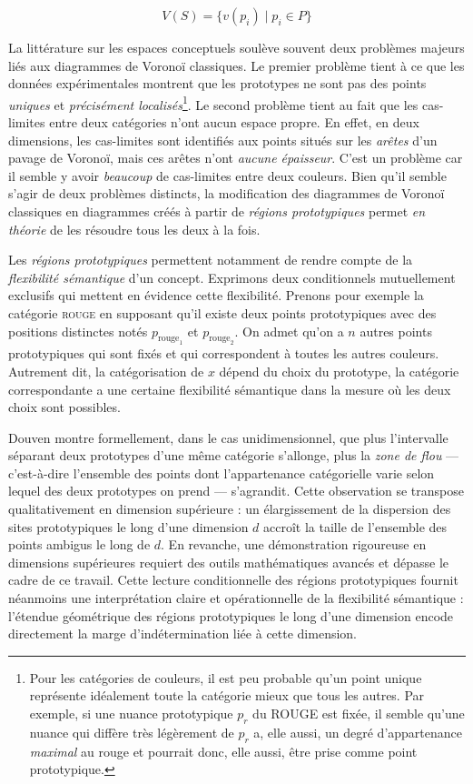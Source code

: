 \documentclass{article}
\begin{document}
\[
V(S) = \{v(p_i) \mid p_i \in P\}
\]

La littérature sur les espaces conceptuels soulève souvent deux problèmes majeurs liés aux diagrammes de Voronoï classiques. Le premier problème tient à ce que les données expérimentales montrent que les prototypes ne sont pas des points \textit{ uniques} et \textit{précisément localisés}\footnote{Pour les catégories de couleurs, il est peu probable qu’un point unique représente idéalement toute la catégorie mieux que tous les autres. Par exemple, si une nuance prototypique $p_r$ du ROUGE est fixée, il semble qu'une nuance qui diffère très légèrement de $p_r$ a, elle aussi, un degré d'appartenance \textit{maximal} au rouge et pourrait donc, elle aussi, être prise comme point prototypique.}. Le second problème tient au fait que les cas-limites entre deux catégories n'ont aucun espace propre. En effet, en deux dimensions, les cas-limites sont identifiés aux points situés sur les \textit{arêtes} d'un pavage de Voronoï, mais ces arêtes n'ont \textit{aucune épaisseur}. C'est un problème car il semble y avoir \textit{beaucoup} de cas-limites entre deux couleurs. Bien qu'il semble s'agir de deux problèmes distincts, la modification des diagrammes de Voronoï classiques en diagrammes créés à partir de \textit{régions prototypiques} permet \textit{en théorie} de les résoudre tous les deux à la fois.

\par

Les \emph{régions prototypiques} permettent notamment de rendre compte de la \emph{flexibilité sémantique} d'un concept. Exprimons deux conditionnels mutuellement exclusifs qui mettent en évidence cette flexibilité. Prenons pour exemple la catégorie \textsc{rouge} en supposant qu'il existe deux points prototypiques avec des positions distinctes notés $p_{\text{rouge}_1}$ et $p_{\text{rouge}_2}$. On admet qu'on a $n$ autres points prototypiques qui sont fixés et qui correspondent à toutes les autres couleurs. Autrement dit, la catégorisation de $x$ dépend du choix du prototype, la catégorie correspondante a une certaine flexibilité sémantique dans la mesure où les deux choix sont possibles.

\par
Douven montre formellement, dans le cas unidimensionnel, que plus l'intervalle séparant deux prototypes d'une même catégorie s'allonge, plus la \emph{zone de flou} — c'est-à-dire l'ensemble des points dont l'appartenance catégorielle varie selon lequel des deux prototypes on prend — s'agrandit. Cette observation se transpose qualitativement en dimension supérieure : un élargissement de la dispersion des sites prototypiques le long d'une dimension $d$ accroît la taille de l'ensemble des points ambigus le long de $d$. En revanche, une démonstration rigoureuse en dimensions supérieures requiert des outils mathématiques avancés et dépasse le cadre de ce travail. Cette lecture conditionnelle des régions prototypiques fournit néanmoins une interprétation claire et opérationnelle de la flexibilité sémantique : l'étendue géométrique des régions prototypiques le long d'une dimension encode directement la marge d'indétermination liée à cette dimension.
\end{document}
